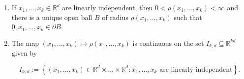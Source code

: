 \documentclass[10pt,a4paper]{amsart}
\newcommand{\eR}[0]{\ensuremath{ \mathbb R}}
\newcommand{\orig}{\underline{0}}
\begin{document}
\begin{lemma}\label{lem:rho}
\text{ }
\begin{enumerate}
 \item\label{itm:ballexist} If $x_1,\dots,x_k \in \eR^d$ are linearly independent, then $0<\rho(x_1,\dots,x_k)<\infty$ and
 there is a unique open ball $B$ of radius $\rho(x_1,\dots,x_k)$ such that $\orig,x_1,\dots,x_k \in \partial B$.
 \item\label{itm:rhocont} The map $(x_1,\dots,x_k) \mapsto \rho(x_1,\dots,x_k)$ is continuous on the 
 set $I_{k,d} \subseteq \eR^{kd}$ given by
 
 $$ I_{k,d} := \left\{  (x_1,\dots,x_k) \in \eR^d \times \dots\times\eR^d : x_1,\dots,x_k
 \text{ are linearly independent}\right\}. $$ 
 
\end{enumerate}
\end{lemma}
\end{document}
